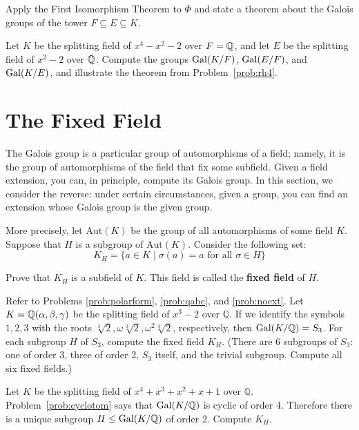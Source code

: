 \begin{problem}\label{prob:rh4}
    Apply the First Isomorphism Theorem to $\Phi$ and state a theorem about the Galois groups of the tower $F\subseteq E \subseteq K$.
\end{problem}

\begin{problem}
    Let $K$ be the splitting field of $x^4-x^2-2$ over $F=\mathbb{Q}$, and let $E$ be the splitting field of $x^2-2$ over $\mathbb{Q}$. Compute the groups $\operatorname{Gal}(K/F)$, $\operatorname{Gal}(E/F)$, and $\operatorname{Gal}(K/E)$, and illustrate the theorem from Problem~\ref{prob:rh4}.
\end{problem}

\section{The Fixed Field}

The Galois group is a particular group of automorphisms of a field; namely, it is the group of automorphisms of the field that fix some subfield.  Given a field extension, you can, in principle, compute its Galois group.  In this section, we consider the reverse: under certain circumstances, given a group, you can find an extension whose Galois group is the given group. \smallskip

More precisely, let $\mbox{Aut}(K)$ be the group of all automorphisms of some field $K$.  Suppose that $H$ is a subgroup of $\mbox{Aut}(K)$.  Consider the following set:
$$K_H = \{a \in K \mid \sigma(a) = a \mbox{ for all } \sigma \in H\}$$

\begin{problem}
 Prove that $K_H$ is a subfield of $K$.  This field is called the \textbf{fixed field} of $H$.
\end{problem}

\begin{problem}\label{prob:ff1}
Refer to Problems \ref{prob:polarform}, \ref{prob:qabc}, and \ref{prob:noext}. Let $K=\mathbb{Q}(\alpha,\beta,\gamma)$ be the splitting field of $x^3-2$ over $\mathbb{Q}$.  If we identify the symbols $1,2,3$ with the roots $\sqrt[3]{2}, \omega\sqrt[3]{2}, \omega^2\sqrt[3]{2}$, respectively, then $\operatorname{Gal}(K/\mathbb{Q}) = S_3$.  For each subgroup $H$ of $S_3$, compute the fixed field $K_H$.  (There are 6 subgroups of $S_3$: one of order 3, three of order 2, $S_3$ itself, and the trivial subgroup.  Compute all six fixed fields.)
\end{problem}

\begin{problem}\label{prob:ff2}
Let $K$ be the splitting field of $x^4+x^3+x^2+x+1$ over $\mathbb{Q}$.  Problem~\ref{prob:cyclotom} says that $\operatorname{Gal}(K/\mathbb{Q})$ is cyclic of order 4.  Therefore there is a unique subgroup $H \leq \operatorname{Gal}(K/\mathbb{Q})$ of order 2.  Compute $K_H$.
\end{problem}

